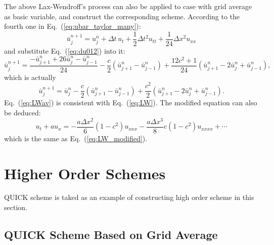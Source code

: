 \documentclass[]{article}
\begin{document}
The above Lax-Wendroff's process can also be applied to case with grid
average as basic variable, and construct the corresponding scheme.
According to the fourth one in Eq.~(\ref{eq:ubar_taylor_many}):
\[
\bar u_{j}^{n+1}  = u_j^n+\Delta t\, u_t + \frac{1}{2}\Delta t^2
u_{tt} + \frac{1}{24} \Delta x^2 u_{xx}
\]
and substitute Eq.~(\ref{eq:du012}) into it:
\[
\bar u_j^{n+1}  = \frac{-\bar u_{j+1}^n + 26\bar u_j^n - \bar u_{j-1}^n}{24}-
\frac{c}{2}\left(\bar u_{j+1}^n-\bar u_{j-1}^n\right) +
\frac{12c^2+1}{24}\left(\bar u_{j+1}^n-2\bar u_j^n+\bar
u_{j-1}^n\right),
\]
which is actually
\begin{equation}
  \bar u_j^{n+1} = \bar u_j^n -\frac{c}{2}\left(\bar u_{j+1}^n-\bar u_{j-1}^n\right) +
  \frac{c^2}{2}\left(\bar u_{j+1}^n-2\bar u_j^n+\bar u_{j-1}^n\right).
  \label{eq:LWav}
\end{equation}
Eq.~(\ref{eq:LWav}) is consistent with Eq.~(\ref{eq:LW}). The
modified equation can also be deduced:
\begin{equation*}
  u_t+au_x=-\frac{a\Delta x^2}{6}(1-c^2)u_{xxx} -\frac{a\Delta x^3}{8}c(1-c^2)u_{xxxx}+\cdots
\end{equation*}
which is the same as Eq.~(\ref{eq:LW_modified}).




\section{Higher Order Schemes}
\label{sec:higher-order-schemes}

QUICK scheme is taked as an example of constructing high order scheme in this
section.

\subsection{QUICK Scheme Based on Grid Average}
\label{sec:quick-scheme-based}
\end{document}
